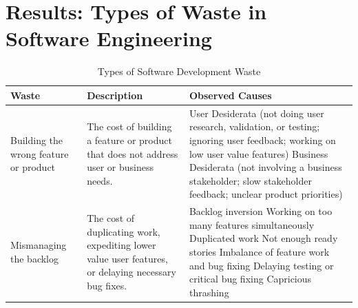 \section{Results: Types of Waste in Software Engineering}
\label{SEWaste}

\begin{table}[t]
\renewcommand{\arraystretch}{1.3}
\centering
\caption{Types of Software Development Waste}
\label{Waste}
\begin{tabular}{|p{1.5in}|p{1.9in}|p{3.2in}|}
\hline
Waste  & Description & Observed Causes                                                                                                                                                                                                                                                                                                                                                                                                                     \\ \hline
Building the wrong feature or product &  The cost of building a feature or product that does not address user or business needs. & 
User Desiderata (not doing user research, validation, or testing; ignoring user feedback; working on low user value features) \newline Business Desiderata (not involving a business stakeholder; slow stakeholder feedback; unclear product priorities)                                                                                                                                                                                  \\ \hline
Mismanaging the backlog     & The cost of duplicating work, expediting lower value user features, or delaying necessary bug fixes.  & 
Backlog inversion \newline Working on too many features simultaneously \newline Duplicated work \newline Not enough ready stories  \newline Imbalance of feature work and bug fixing \newline Delaying testing or critical bug fixing \newline Capricious thrashing                                                                                                                                                                                                                                                                                                                                    \\ \hline

\end{tabular}
\end{table}
